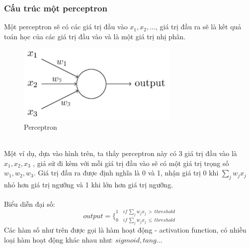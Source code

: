 \subsubsection{Cấu trúc một perceptron}
Một perceptron sẽ có các giá trị đầu vào $x_1, x_2, ...$, giá trị đầu ra sẽ 
là kết quả toán học của các giá trị đầu vào và là một giá trị nhị phân.\\
\begin{figure}[h!]
\centering
\includegraphics[height=1.5in, keepaspectratio=true]{perceptron_n.png}
\caption{Perceptron}
\end{figure}\\
Một ví dụ, dựa vào hình trên, ta thấy perceptron này có 3 giá trị đầu vào là 
$x_1, x_2, x_3$ , giả sử đi kèm với mỗi giá trị đầu vào sẽ có một giá trị trọng 
số $w_1, w_2, w_3$. Giá trị đầu ra được định nghĩa là 0 và 1, nhận giá trị 0 
khi $\sum_j w_j x_j$ nhỏ hơn giá trị ngưỡng và 1 khi lớn hơn giá trị ngưỡng.\\\\
Biểu diễn đại số:
\[
  output = 
  \bigg\{
    _{0 \quad if \, \sum_j w_j x_j \, \leq \, threshold}
    ^{1 \quad if \, \sum_j w_j x_j \, > \, threshold}
\]
Các hàm số như trên được gọi là hàm hoạt động - activation function, có nhiều 
loại hàm hoạt động khác nhau như: $sigmoid , tang ...$
